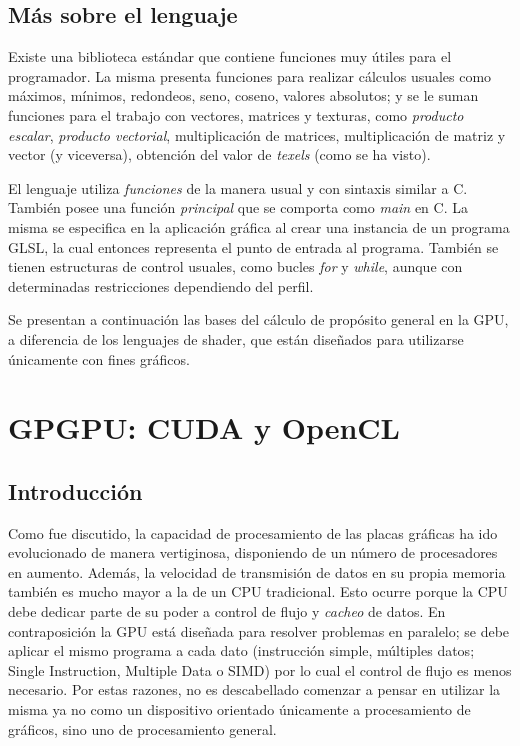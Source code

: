 


\subsection{M\'as sobre el lenguaje}
Existe una biblioteca est\'andar que contiene funciones muy \'utiles para el programador. La misma presenta funciones para realizar c\'alculos usuales como m\'aximos, m\'inimos, redondeos, seno, coseno, valores absolutos; y se le suman funciones para el trabajo con vectores, matrices y texturas, como {\em producto escalar}, {\em producto vectorial}, multiplicaci\'on de matrices, multiplicaci\'on de matriz y vector (y viceversa), obtenci\'on del valor de {\em texels} (como se ha visto).

El lenguaje utiliza {\em funciones} de la manera usual y con sintaxis similar a C.
Tambi\'en posee una funci\'on {\em principal} que se comporta como {\em main} en C.
La misma se especifica en la aplicaci\'on gr\'afica al crear una instancia de un programa GLSL, la cual entonces representa el punto de entrada al programa.
Tambi\'en se tienen estructuras de control usuales, como bucles {\em for} y {\em while}, aunque con determinadas restricciones dependiendo del perfil.

Se presentan a continuaci\'on las bases del c\'alculo de prop\'osito general en la GPU, a diferencia de los lenguajes de shader, que est\'an dise\~nados para utilizarse \'unicamente con fines gr\'aficos.

\section{GPGPU: CUDA y OpenCL}

\subsection{Introducción}
Como fue discutido, la capacidad de procesamiento de las placas gr\'aficas ha ido evolucionado de manera vertiginosa, disponiendo de un n\'umero de procesadores en aumento.
Adem\'as, la velocidad de transmisi\'on de datos en su propia memoria tambi\'en es mucho mayor a la de un CPU tradicional.
Esto ocurre porque la CPU debe dedicar parte de su poder a control de flujo y {\em cacheo} de datos.
En contraposici\'on la GPU est\'a dise\~nada para resolver problemas en paralelo; se debe aplicar el mismo programa a cada dato (instrucción simple, múltiples datos; Single Instruction, Multiple Data o \acrshort{SIMD}) por lo cual el control de flujo es menos necesario.
Por estas razones, no es descabellado comenzar a pensar en utilizar la misma ya no como un dispositivo orientado \'unicamente a procesamiento de gr\'aficos, sino uno de procesamiento general.


